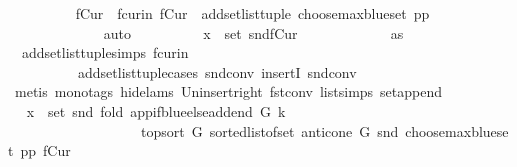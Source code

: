 \begin{isabellebody}
\ \ \ \ \ \ \ \ \isamarkupfalse%
\ fCur\ \ fcur{\isacharunderscore}{\kern0pt}in{\isacharcolon}{\kern0pt}\ {\isachardoublequoteopen}fCur\ {\isacharequal}{\kern0pt}\ add{\isacharunderscore}{\kern0pt}set{\isacharunderscore}{\kern0pt}list{\isacharunderscore}{\kern0pt}tuple\ {\isacharparenleft}{\kern0pt}choose{\isacharunderscore}{\kern0pt}max{\isacharunderscore}{\kern0pt}blue{\isacharunderscore}{\kern0pt}set\ pp{\isacharparenright}{\kern0pt}{\isachardoublequoteclose}\isanewline
\ \ \ \ \ \ \ \ \ \ \ \ \isamarkupfalse%
\ auto\isanewline
\ \ \ \ \ \ \ \ \isamarkupfalse%
\ {\isachardoublequoteopen}x\ {\isasymin}\ set\ {\isacharparenleft}{\kern0pt}snd{\isacharparenleft}{\kern0pt}fCur{\isacharparenright}{\kern0pt}{\isacharparenright}{\kern0pt}{\isachardoublequoteclose}\ \isanewline
\ \ \ \ \ \ \ \ \ \ \isamarkupfalse%
\ as{}\ \isamarkupfalse%
\ \ add{\isacharunderscore}{\kern0pt}set{\isacharunderscore}{\kern0pt}list{\isacharunderscore}{\kern0pt}tuple{\isachardot}{\kern0pt}simps\ fcur{\isacharunderscore}{\kern0pt}in\isanewline
\ \ \ \ \ \ \ \ \ \ add{\isacharunderscore}{\kern0pt}set{\isacharunderscore}{\kern0pt}list{\isacharunderscore}{\kern0pt}tuple{\isachardot}{\kern0pt}cases\ snd{\isacharunderscore}{\kern0pt}conv\ insertI{}\ snd{\isacharunderscore}{\kern0pt}conv\isanewline
\ \ \ \ \ \ \ \ \ \ \isamarkupfalse%
\ {\isacharparenleft}{\kern0pt}metis\ {\isacharparenleft}{\kern0pt}mono{\isacharunderscore}{\kern0pt}tags{\isacharcomma}{\kern0pt}\ hide{\isacharunderscore}{\kern0pt}lams{\isacharparenright}{\kern0pt}\ Un{\isacharunderscore}{\kern0pt}insert{\isacharunderscore}{\kern0pt}right\ fst{\isacharunderscore}{\kern0pt}conv\ list{\isachardot}{\kern0pt}simps{\isacharparenleft}{\kern0pt}{}{}{\isacharparenright}{\kern0pt}\ set{\isacharunderscore}{\kern0pt}append{\isacharparenright}{\kern0pt}\ \isanewline
\ \ \ \ \ \ \ \ \isamarkupfalse%
\ \isamarkupfalse%
\ {\isachardoublequoteopen}x\ {\isasymin}\ set\ {\isacharparenleft}{\kern0pt}snd\ {\isacharparenleft}{\kern0pt}fold\ {\isacharparenleft}{\kern0pt}app{\isacharunderscore}{\kern0pt}if{\isacharunderscore}{\kern0pt}blue{\isacharunderscore}{\kern0pt}else{\isacharunderscore}{\kern0pt}add{\isacharunderscore}{\kern0pt}end\ G\ k{\isacharparenright}{\kern0pt}\isanewline
\ \ \ \ \ \ \ \ \ \ \ \ \ \ \ \ \ \ \ {\isacharparenleft}{\kern0pt}top{\isacharunderscore}{\kern0pt}sort\ G\ {\isacharparenleft}{\kern0pt}sorted{\isacharunderscore}{\kern0pt}list{\isacharunderscore}{\kern0pt}of{\isacharunderscore}{\kern0pt}set\ {\isacharparenleft}{\kern0pt}anticone\ G\ {\isacharparenleft}{\kern0pt}snd\ {\isacharparenleft}{\kern0pt}choose{\isacharunderscore}{\kern0pt}max{\isacharunderscore}{\kern0pt}blue{\isacharunderscore}{\kern0pt}set\ pp{\isacharparenright}{\kern0pt}{\isacharparenright}{\kern0pt}{\isacharparenright}{\kern0pt}{\isacharparenright}{\kern0pt}{\isacharparenright}{\kern0pt}\ {\isacharparenleft}{\kern0pt}fCur{\isacharparenright}{\kern0pt}{\isacharparenright}{\kern0pt}{\isacharparenright}{\kern0pt}{\isachardoublequoteclose}\isanewline

\end{isabellebody}
